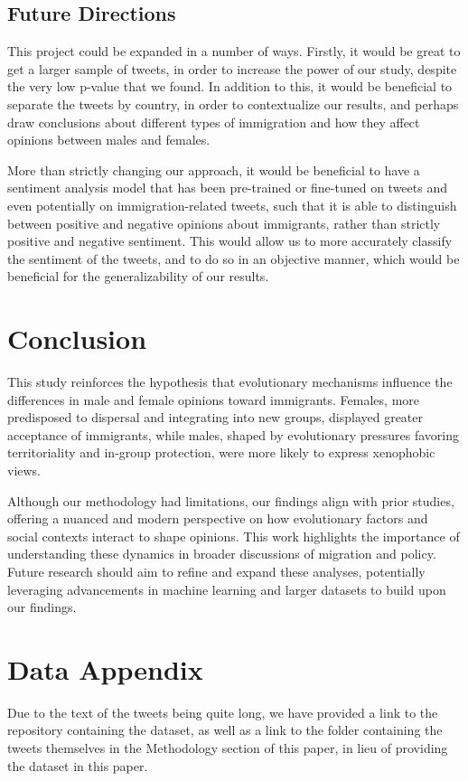 \documentclass{article}
\begin{document}
\subsection{Future Directions}

This project could be expanded in a number of ways. Firstly, it would be great to get a larger sample of tweets, in order to increase the power of our study, despite the very low p-value that we found. In addition to this, it would be beneficial to separate the tweets by country, in order to contextualize our results, and perhaps draw conclusions about different types of immigration and how they affect opinions between males and females.

More than strictly changing our approach, it would be beneficial to have a sentiment analysis model that has been pre-trained or fine-tuned on tweets and even potentially on immigration-related tweets, such that it is able to distinguish between positive and negative opinions about immigrants, rather than strictly positive and negative sentiment. This would allow us to more accurately classify the sentiment of the tweets, and to do so in an objective manner, which would be beneficial for the generalizability of our results.

\section{Conclusion}

This study reinforces the hypothesis that evolutionary mechanisms influence the differences in male and female opinions toward immigrants. Females, more predisposed to dispersal and integrating into new groups, displayed greater acceptance of immigrants, while males, shaped by evolutionary pressures favoring territoriality and in-group protection, were more likely to express xenophobic views.

Although our methodology had limitations, our findings align with prior studies, offering a nuanced and modern perspective on how evolutionary factors and social contexts interact to shape opinions. This work highlights the importance of understanding these dynamics in broader discussions of migration and policy. Future research should aim to refine and expand these analyses, potentially leveraging advancements in machine learning and larger datasets to build upon our findings.

\section{Data Appendix}
Due to the text of the tweets being quite long, we have provided a link to the repository containing the dataset, as well as a link to the folder containing the tweets themselves in the Methodology section of this paper, in lieu of providing the dataset in this paper.
\end{document}

